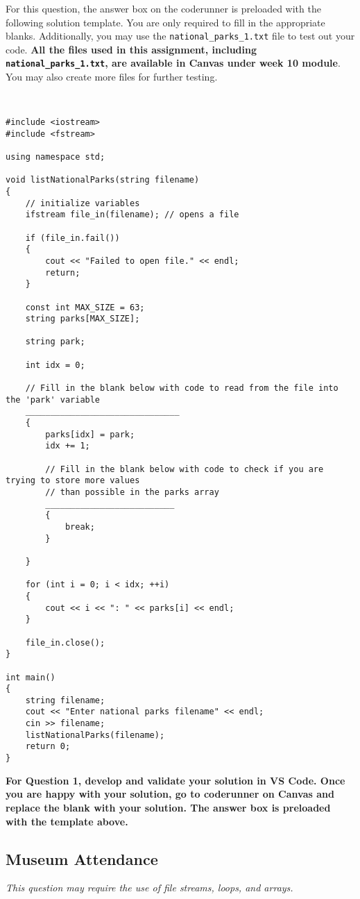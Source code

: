 For this question, the answer box on the coderunner is preloaded with the following solution template. You are only required to fill in the appropriate blanks. Additionally, you may use the \texttt{national\_parks\_1.txt} file to test out your code. \textbf{All the files used in this assignment, including \texttt{national\_parks\_1.txt}, are available in Canvas under week 10 module}. You may also create more files for further testing.
\begin{example}
\begin{verbatim}


#include <iostream>
#include <fstream>

using namespace std;

void listNationalParks(string filename)
{
    // initialize variables
    ifstream file_in(filename); // opens a file

    if (file_in.fail())
    {
        cout << "Failed to open file." << endl;
        return;
    }

    const int MAX_SIZE = 63;
    string parks[MAX_SIZE];

    string park;

    int idx = 0;

    // Fill in the blank below with code to read from the file into the 'park' variable
    _______________________________
    {
        parks[idx] = park;
        idx += 1;

        // Fill in the blank below with code to check if you are trying to store more values 
        // than possible in the parks array
        __________________________
        {
            break;
        }

    }

    for (int i = 0; i < idx; ++i)
    {
        cout << i << ": " << parks[i] << endl;
    }

    file_in.close();
}

int main()
{
    string filename;
    cout << "Enter national parks filename" << endl;
    cin >> filename;
    listNationalParks(filename);
    return 0;
}
\end{verbatim}
\end{example}

\textbf{For Question 1, develop and validate your solution in VS Code. Once you are happy with your solution, go to coderunner on Canvas and replace the blank with your solution. The answer box is preloaded with the template above.} 

\subsection{Museum Attendance} %
\textit{This question may require the use of file streams, loops, and arrays.} \newline

